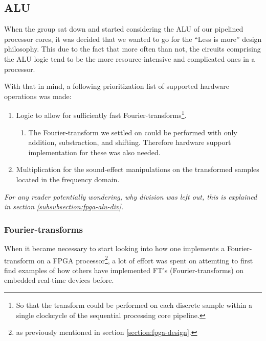 \subsection{ALU}\label{subsection:fpga-alu}

When the group sat down and started considering the ALU of our pipelined
processor cores, it was decided that we wanted to go for the ``Less is more''
design philosophy. This due to the fact that more often than not, the circuits
comprising the ALU logic tend to be the more resource-intensive and complicated
ones in a processor.

With that in mind, a following prioritization list of supported hardware
operations was made:
\begin{enumerate}
	\item Logic to allow for sufficiently fast Fourier-transforms\footnote{So
that the transform could be performed on each discrete sample within a single
clockcycle of the sequential processing core pipeline.}.
	\begin{enumerate}
		\item The Fourier-transform we settled on could be performed with only
addition, substraction, and shifting. Therefore hardware support implementation
for these was also needed.
	\end{enumerate}
	\item Multiplication for the sound-effect manipulations on the transformed
samples located in the frequency domain.
\end{enumerate}
\emph{For any reader potentially wondering, why division was left out, this is
explained in section \ref{subsubsection:fpga-alu-div}.}

\subsubsection{Fourier-transforms}\label{subsubsection:fpga-alu-ft}

When it became necessary to start looking into how one implements a
Fourier-transform on a FPGA processor\footnote{as previously mentioned in section
\ref{section:fpga-design}.}, a lot of effort was spent on attemting to first
find examples of how others have implemented FT's (Fourier-transforms) on
embedded real-time devices before.

